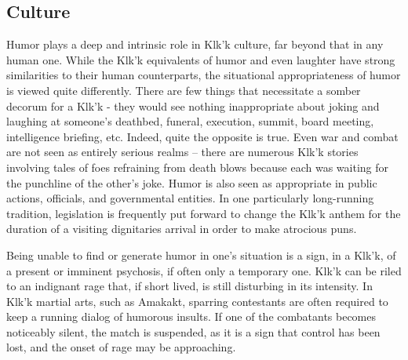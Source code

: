 \subsection{Culture}
Humor plays a deep and intrinsic role in Klk'k culture, far beyond
that in any human one. While the Klk'k equivalents of humor and even
laughter have strong similarities to their human counterparts, the
situational appropriateness of humor is viewed quite
differently. There are few things that necessitate a somber decorum
for a Klk'k - they would see nothing inappropriate about joking and
laughing at someone's deathbed, funeral, execution, summit, board
meeting, intelligence briefing, etc. Indeed, quite the opposite is
true. Even war and combat are not seen as entirely serious realms --
there are numerous Klk'k stories involving tales of foes refraining
from death blows because each was waiting for the punchline of the
other's joke. Humor is also seen as appropriate in public actions,
officials, and governmental entities. In one particularly long-running
tradition, legislation is frequently put forward to change the Klk'k
anthem for the duration of a visiting dignitaries arrival in order to
make atrocious puns.

Being unable to find or generate humor in one's situation is a sign,
in a Klk'k, of a present or imminent psychosis, if often only a
temporary one. Klk'k can be riled to an indignant rage that, if short
lived, is still disturbing in its intensity. In Klk'k martial arts,
such as Amakakt, sparring contestants are often required to keep a
running dialog of humorous insults. If one of the combatants becomes
noticeably silent, the match is suspended, as it is a sign that
control has been lost, and the onset of rage may be approaching.

